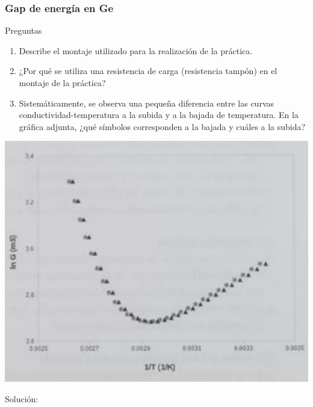 \begin{Enunciado}
	\subsubsection{Gap de energía en Ge}
	\begin{minipage}{0.5\linewidth}
		Preguntas
		\begin{enumerate}[label=\alph*)]
			\item Describe el montaje utilizado para la realización de la práctica.
			\item ¿Por qué se utiliza una resistencia de carga (resistencia tampón) en el montaje de la práctica?
			\item Sistemáticamente, se observa una pequeña diferencia entre las curvas conductividad-temperatura a la subida y a la bajada de temperatura. En la gráfica adjunta, ¿qué símbolos corresponden a la bajada y cuáles a la subida?
		\end{enumerate}
	\end{minipage}\hfill
	\begin{minipage}{0.45\linewidth}
		\includegraphics[width=0.9\linewidth]{Cuerpo/Ch_02/Examen_24_7.png}
	\end{minipage}
\end{Enunciado}

Solución:

